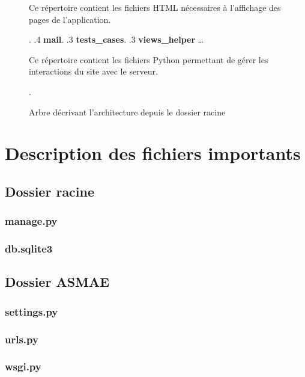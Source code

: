 \begin{figure}[!ht]
\begin{framed}
{\begin{minipage}[t]{10cm}
									Ce répertoire contient les fichiers
									HTML nécessaires à l'affichage des pages
									de l'application{.}
									\end{minipage}.
			.4 \textbf{mail}.
			.3 \textbf{tests\_cases}.
			.3 \textbf{views\_helper} \ldots{} \begin{minipage}[t]{10cm}
									Ce répertoire contient les fichiers
									Python permettant de gérer les interactions
									du site avec le serveur{.}
									\end{minipage}.
		}
	\end{framed}
	\caption{Arbre décrivant l'architecture depuis le dossier racine}
	\label{fig:Architecture des dossiers}
\end{figure}
\FloatBarrier

\section{Description des fichiers importants}

\subsection{Dossier racine}

\subsubsection{manage.py}

\subsubsection{db.sqlite3}

\subsection{Dossier ASMAE}

\subsubsection{settings.py}

\subsubsection{urls.py}

\subsubsection{wsgi.py}

